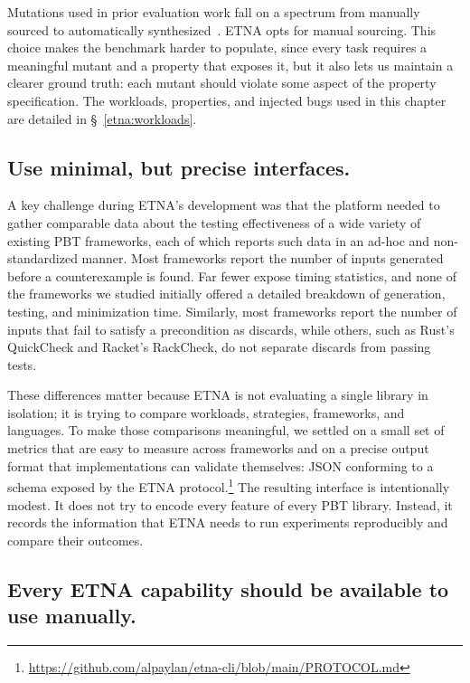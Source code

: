 Mutations used in prior evaluation work fall on a spectrum from manually sourced to
automatically synthesized~\cite{Hazimeh:2020:Magma,EvaluatingFuzzTesting,
  FixReverter,TestingNIjfp}. ETNA opts for manual sourcing. This choice makes the
benchmark harder to populate, since every task requires a meaningful mutant and a
property that exposes it, but it also lets us maintain a clearer ground truth: each
mutant should violate some aspect of the property specification. The workloads,
properties, and injected bugs used in this chapter are detailed in
\S~\ref{etna:workloads}.

\subsection{Use minimal, but precise interfaces.}

A key challenge during ETNA's development was that the platform needed to gather
comparable data about the testing effectiveness of a wide variety of existing PBT
frameworks, each of which reports such data in an ad-hoc and non-standardized manner.
Most frameworks report the number of inputs generated before a counterexample is found.
Far fewer expose timing statistics, and none of the frameworks we studied initially
offered a detailed breakdown of generation, testing, and minimization time. Similarly,
most frameworks report the number of inputs that fail to satisfy a precondition as
discards, while others, such as Rust's QuickCheck and Racket's RackCheck, do not
separate discards from passing tests.

These differences matter because ETNA is not evaluating a single library in isolation;
it is trying to compare workloads, strategies, frameworks, and languages. To make those
comparisons meaningful, we settled on a small set of metrics that are easy to measure
across frameworks and on a precise output format that implementations can validate
themselves: JSON conforming to a schema exposed by the ETNA
protocol.\footnote{\url{https://github.com/alpaylan/etna-cli/blob/main/PROTOCOL.md}}
The resulting interface is intentionally modest. It does not try to encode every
feature of every PBT library. Instead, it records the information that ETNA needs to
run experiments reproducibly and compare their outcomes.

\subsection{Every ETNA capability should be available to use manually.}

